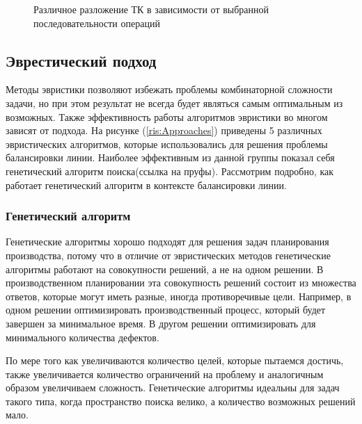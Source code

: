 \begin{figure}[H]
    \caption{Различное разложение ТК в зависимости от выбранной последовательности операций}
    \label{ris:DecompositionOfTk}
\end{figure}

\subsection{Эврестический подход}

Методы эвристики позволяют избежать проблемы комбинаторной сложности задачи, но при этом результат не всегда будет являться самым оптимальным из возможных. Также эффективность работы алгоритмов эвристики во многом зависят от подхода. На рисунке (\ref{ris:Approaches}) приведены 5 различных эвристических алгоритмов, которые использовались для решения проблемы балансировки линии. Наиболее эффективным из данной группы показал себя генетический алгоритм поиска(ссылка на пруфы). Рассмотрим подробно, как работает генетический алгоритм в контексте балансировки линии.

\subsubsection{Генетический алгоритм}

Генетические алгоритмы хорошо подходят для решения задач планирования производства, потому что в отличие от эвристических методов генетические алгоритмы работают на совокупности решений, а не на одном решении. В производственном планировании эта совокупность решений состоит из множества ответов, которые могут иметь разные, иногда противоречивые цели. Например, в одном решении оптимизировать производственный процесс, который будет завершен за минимальное время. В другом решении оптимизировать для минимального количества дефектов.

По мере того как увеличиваются количество целей, которые пытаемся достичь, также увеличивается количество ограничений на проблему и аналогичным образом увеличиваем сложность. Генетические алгоритмы идеальны для задач такого типа, когда пространство поиска велико, а количество возможных решений мало.

